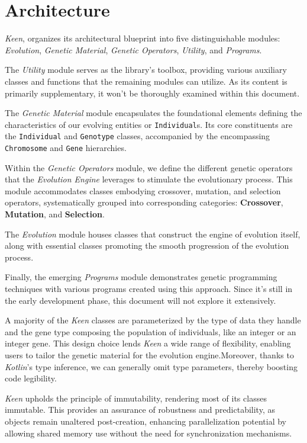 \section{Architecture}
\label{sec:architecture}
  \textit{Keen}, organizes its architectural blueprint into five distinguishable modules: \textit{Evolution}, \textit{Genetic Material}, \textit{Genetic Operators}, \textit{Utility}, and \textit{Programs}.

  The \emph{Utility} module serves as the library's toolbox, providing various auxiliary classes and functions that the remaining modules can utilize. As its content is primarily supplementary, it won't be thoroughly examined within this document.

  The \emph{Genetic Material} module encapsulates the foundational elements defining the characteristics of our evolving entities or \texttt{Individual}s. Its core constituents are the \texttt{Individual} and \texttt{Genotype} classes, accompanied by the encompassing \texttt{Chromosome} and \texttt{Gene} hierarchies.

  Within the \emph{Genetic Operators} module, we define the different genetic operators that the \textit{Evolution Engine} leverages to stimulate the evolutionary process. This module accommodates classes embodying crossover, mutation, and selection operators, systematically grouped into corresponding categories: \textbf{Crossover}, \textbf{Mutation}, and \textbf{Selection}.

  The \emph{Evolution} module houses classes that construct the engine of evolution itself, along with essential classes promoting the smooth progression of the evolution process.

  Finally, the emerging \emph{Programs} module demonstrates genetic programming techniques with various programs created using this approach. Since it's still in the early development phase, this document will not explore it extensively.

  A majority of the \textit{Keen} classes are parameterized by the type of data they handle and the gene type composing the population of individuals, like an integer or an integer gene. This design choice lends \textit{Keen} a wide range of flexibility, enabling users to tailor the genetic material for the evolution engine.Moreover, thanks to \textit{Kotlin}'s type inference, we can generally omit type parameters, thereby boosting code legibility.

  \textit{Keen} upholds the principle of immutability, rendering most of its classes immutable.
  This provides an assurance of robustness and predictability, as objects remain unaltered post-creation, enhancing parallelization potential by allowing shared memory use without the need for synchronization mechanisms.

